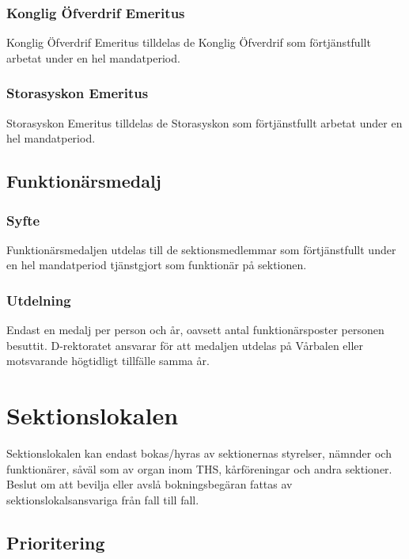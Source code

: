 \documentclass{dgovdoc}
\begin{document}
\subsubsection{Konglig Öfverdrif Emeritus}

Konglig Öfverdrif Emeritus tilldelas de Konglig Öfverdrif som förtjänstfullt arbetat under en hel mandatperiod.

\subsubsection{Storasyskon Emeritus}

Storasyskon Emeritus tilldelas de Storasyskon som förtjänstfullt arbetat under en hel mandatperiod.

\subsection{Funktionärsmedalj}

\subsubsection{Syfte}

Funktionärsmedaljen utdelas till de sektionsmedlemmar som förtjänstfullt under en hel mandatperiod tjänstgjort som funktionär på sektionen.

\subsubsection{Utdelning}

Endast en medalj per person och år, oavsett antal funktionärsposter personen besuttit. D-rektoratet ansvarar för att medaljen utdelas på Vårbalen eller motsvarande högtidligt tillfälle samma år.

\section{Sektionslokalen}

Sektionslokalen kan endast bokas/hyras av sektionernas styrelser, nämnder och funktionärer, såväl som av organ inom THS, kårföreningar och andra sektioner. Beslut om att bevilja eller avslå bokningsbegäran fattas av sektionslokalsansvariga från fall till fall.

\subsection{Prioritering}
\end{document}

